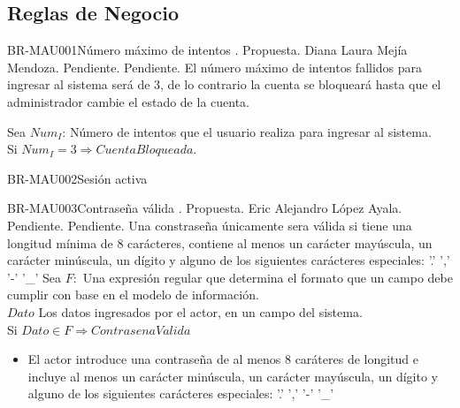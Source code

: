 

\subsection{Reglas de Negocio}



\begin{BusinessRule}{BR-MAU001}{Número máximo de intentos}{}{}{}
	.
	\BRItem[Estado] Propuesta.
	 Diana Laura Mejía Mendoza.
	 Pendiente.
	 Pendiente.
	\BRItem[Descripción]El número máximo de intentos fallidos para ingresar al sistema será de 3, de lo contrario la cuenta se bloqueará hasta que el administrador cambie el estado de la cuenta.
	
	\BRItem[Sentencia] Sea $Num_I$: Número de intentos que el usuario realiza para ingresar al sistema. \\

	Si $Num_I = 3 \Longrightarrow CuentaBloqueada$.


\end{BusinessRule}


\begin{BusinessRule}{BR-MAU002}{Sesión activa}{}{}{}


\end{BusinessRule}


\begin{BusinessRule}{BR-MAU003}{Contraseña válida}{}{}{}
	.
	\BRItem[Estado] Propuesta.
	 Eric Alejandro López Ayala.
	 Pendiente.
	 Pendiente.
	\BRItem[Descripción] Una constraseña únicamente sera válida si tiene una longitud mínima de 8 carácteres, contiene al menos un carácter mayúscula, un carácter minúscula, un dígito y alguno de los siguientes carácteres especiales: '.' ',' '-' '\_'
	\BRItem[Sentencia] Sea $F:$ Una expresión regular que determina el formato que un campo debe cumplir con base en el modelo de información. \\ $Dato$ Los datos ingresados por el actor, en un campo del sistema.\\
	
	Si $ Dato \in F \Longrightarrow ContrasenaValida $
	\BRItem[Ejemplos]
	\begin{itemize}
		\item El actor introduce una contraseña de al menos 8 caráteres de longitud e incluye al menos un carácter minúscula, un carácter mayúscula, un dígito y alguno de los siguientes carácteres especiales: '.' ',' '-' '\_'
	\end{itemize}
	
\end{BusinessRule}

